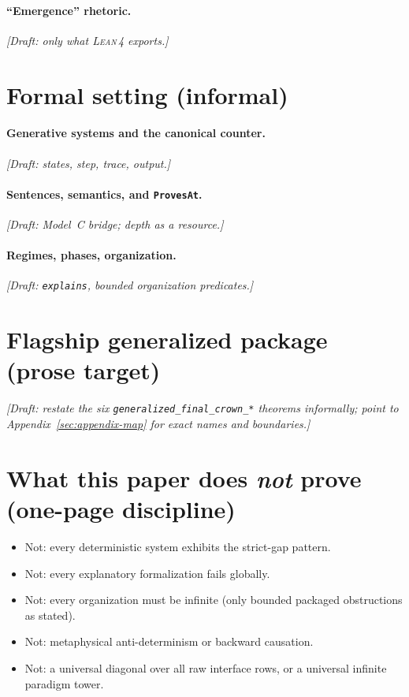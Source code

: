 \documentclass[11pt,a4paper]{article}
\theoremstyle{definition}
\newcommand{\lean}{\textsc{Lean}\,4}
\begin{document}
\paragraph{``Emergence'' rhetoric.}
\emph{[Draft: only what \lean{} exports.]}

\section{Formal setting (informal)}\label{sec:formal-overview}

\paragraph{Generative systems and the canonical counter.}
\emph{[Draft: states, step, trace, output.]}

\paragraph{Sentences, semantics, and \texttt{ProvesAt}.}
\emph{[Draft: Model~C bridge; depth as a resource.]}

\paragraph{Regimes, phases, organization.}
\emph{[Draft: \texttt{explains}, bounded organization predicates.]}

\section{Flagship generalized package (prose target)}\label{sec:flagship}

\emph{[Draft: restate the six \texttt{generalized\_final\_crown\_*} theorems informally; point to Appendix~\ref{sec:appendix-map} for exact names and boundaries.]}

\section{What this paper does \emph{not} prove (one-page discipline)}\label{sec:not-prove}

\begin{itemize}[leftmargin=2em]
\item Not: every deterministic system exhibits the strict-gap pattern.
\item Not: every explanatory formalization fails globally.
\item Not: every organization must be infinite (only bounded packaged obstructions as stated).
\item Not: metaphysical anti-determinism or backward causation.
\item Not: a universal diagonal over all raw interface rows, or a universal infinite paradigm tower.
\end{itemize}
\end{document}
